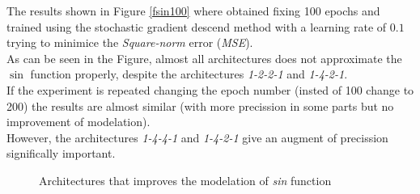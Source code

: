 \documentclass[a4paper, 11pt]{article}
\begin{document}
The results shown in Figure \ref{fsin100} where obtained fixing 100 epochs and trained using the stochastic gradient descend method with a learning rate of $0.1$ trying to minimice the \textit{Square-norm} error (\textit{MSE}).\\
As can be seen in the Figure, almost all architectures does not approximate the $\sin$ function properly, despite the architectures \textit{1-2-2-1} and \textit{1-4-2-1}.\\
If the experiment is repeated changing the epoch number (insted of 100 change to 200) the results are almost similar (with more precission in some parts but no improvement of modelation).\\
However, the architectures \textit{1-4-4-1} and \textit{1-4-2-1} give an augment of precission significally important.
\begin{figure}[h]
    \hspace{1em}
    \caption{Architectures that improves the modelation of \textit{sin} function}
    \label{fsin200}
\end{figure}\\
\end{document}
